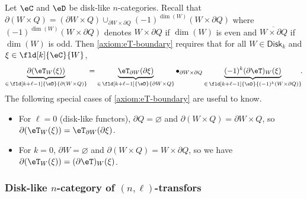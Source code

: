 \documentclass[12pt,reqno]{amsart}
\newcommand{\Disk}{\mathsf{Disk}}
\newcommand{\C}{\eC}
\newcommand{\D}{\eD}
\newcommand{\blt}{\bullet}
\newcommand{\orev}{\overline}
\begin{document}
\begin{remark}
  \label{rmk:transfor boundary axiom}
  Let $\C$ and $\D$ be disk-like $n$-categories. Recall that $\partial(W \times Q) = (\partial W \times Q) \cup_{\partial W \times \partial Q} 
  (-1)^{\dim(W)}(W \times \partial Q)$ where $(-1)^{\dim(W)}(W\times\partial Q)$ denotes $W\times\partial Q$ if $\dim(W)$ is even and $\orev{W\times \partial Q}$ if $\dim(W)$ is odd. Then \ref{axiom:eT-boundary} requires that for all $W \in \Disk_k$ and $\xi \in \fld[k]{\C}{W}$,
  \[
    \underbrace{\partial(\eT_W(\xi))}_{\in \,\fld[k+\ell-1]{\D}{\partial(W \times Q)}}
    =
    \underbrace{\eT_{\partial W}(\partial \xi)}_{\in\, \fld[k+\ell-1]{\D}{\partial W \times Q}}
    \blt_{\partial W\times\partial Q}
    \underbrace{(-1)^{k}(\partial \eT)_W(\xi)}_{\in\,\fld[k+\ell-1]{\D}{(-1)^{k}(W \times \partial Q)}}\kern-.75ex.
  \]
  The following special cases of \ref{axiom:eT-boundary} are useful to know.
  \begin{itemize}
    \item For $\ell=0$ (disk-like functors), $\partial Q = \varnothing$ and $\partial(W\times Q)= \partial W \times Q$, so $\partial (\eT_W(\xi)) = \eT_{\partial W}(\partial \xi)$.
    \item For $k=0$, $\partial W = \varnothing$ and $\partial (W \times Q)= W \times \partial Q$, so we have $\partial( \eT_W(\xi)) = (\partial \eT)_W(\xi)$.
  \end{itemize}
\end{remark}

 


\subsubsection{Disk-like \texorpdfstring{$n$}{n}-category of \texorpdfstring{$(n,\ell)$}{(n,l)}-transfors}


\
\end{document}
